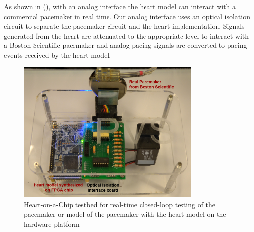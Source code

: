 As shown in (), with an analog interface the heart model can interact with a commercial pacemaker in real time. Our analog interface uses an optical isolation circuit to separate the pacemaker circuit and the heart implementation. Signals generated from the heart are attenuated to the appropriate level to interact with a Boston Scientific pacemaker and analog pacing signals are converted to pacing events received by the heart model. 

\begin{figure}[!b]
\center
		\includegraphics[width=0.8\textwidth]{figs/PVS.pdf}
\caption{Heart-on-a-Chip testbed for real-time closed-loop testing of the pacemaker or model of the pacemaker with the heart model on the hardware platform}
\label{fig:HOC}
\end{figure}
